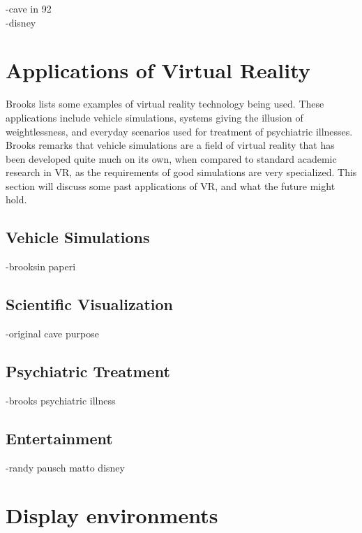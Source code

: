 \documentclass[12pt,a4paper,oneside,pdftex]{report}
\begin{document}
-cave in 92 \\
-disney 

\section{Applications of Virtual Reality}
\label{section:applicationsofvr}

Brooks \cite{Brooks:1999:WRV:616061.618660} lists some examples of virtual reality technology being used. These applications include vehicle simulations, systems giving the illusion of weightlessness, and everyday scenarios used for treatment of psychiatric illnesses. Brooks remarks that vehicle simulations are a field of virtual reality that has been developed quite much on its own, when compared to standard academic research in VR, as the requirements of good simulations are very specialized. This section will discuss some past applications of VR, and what the future might hold.

\subsection{Vehicle Simulations}
\label{subsection:applications:vehiclesimulations}

-brooksin paperi

\subsection{Scientific Visualization}
\label{subsection:applications:visualization}

-original cave purpose

\subsection{Psychiatric Treatment}
\label{subsection:applications:psychiatric}

-brooks psychiatric illness

\subsection{Entertainment}
\label{subsection:applications:entertainment}

-randy pausch matto disney \cite{PauschDisney}




\section{Display environments}
\label{section:displayenvironments}
\end{document}
